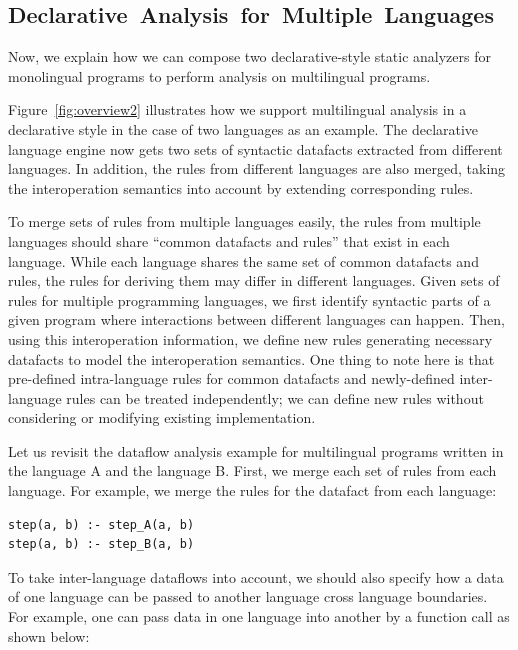 \subsection{\mbox{Declarative Analysis for Multiple Languages}}
Now, we explain how we can compose two declarative-style static analyzers
for monolingual programs to perform analysis on multilingual programs.

Figure~\ref{fig:overview2} illustrates how we support multilingual
analysis in a declarative style in the case of two languages as an
example. The declarative language engine now gets two sets of
syntactic datafacts extracted from different languages. In addition,
the rules from different languages are also merged, taking the
interoperation semantics into account by extending corresponding
rules.

To merge sets of rules from multiple languages easily,
the rules from multiple languages should share ``common datafacts and rules''
that exist in each language. While each language shares the same set of
common datafacts and rules, the rules for deriving them may differ in different languages.
Given sets of rules for multiple programming languages,
we first identify syntactic parts of a given program where
interactions between different languages can happen.
Then, using this interoperation information,
we define new rules generating necessary datafacts to model
the interoperation semantics.
One thing to note here is that pre-defined intra-language rules for common
datafacts and newly-defined inter-language rules can be treated independently;
we can define new rules without considering or modifying existing
implementation.

Let us revisit the dataflow analysis example for multilingual programs
written in the language A and the language B.
First, we merge each set of rules from each language.
For example, we merge the rules for the datafact  from each language:
\begin{lstlisting}[style=myDatalog,xleftmargin=2.5em]
step(a, b) :- step_A(a, b)
step(a, b) :- step_B(a, b)
\end{lstlisting}
To take inter-language dataflows into account, we should also specify
how a data of one language can be passed to another language cross language
boundaries.  For example, one can pass data in one language into
another by a function call as shown below:

